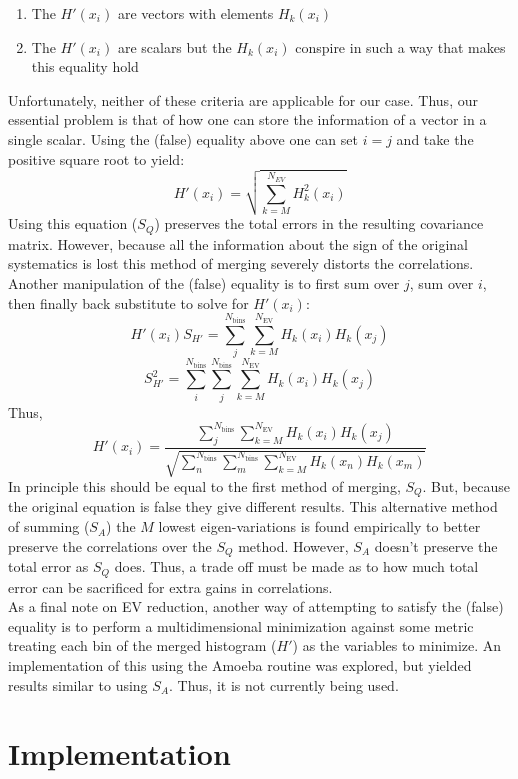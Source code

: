 \begin{enumerate}
\def\labelenumi{\arabic{enumi}.}
\itemsep1pt\parskip0pt
\item
  The $H'(x_i)$ are vectors with elements $H_k(x_i)$
\item
  The $H'(x_i)$ are scalars but the $H_k(x_i)$ conspire in such a way
  that makes this equality hold
\end{enumerate}

Unfortunately, neither of these criteria are applicable for our case.
Thus, our essential problem is that of how one can store the information
of a vector in a single scalar. Using the (false) equality above one can
set $i=j$ and take the positive square root to yield: \[
H'(x_i)=\sqrt{\sum_{k=M}^{N_{EV}}H_k^2(x_i)}
\] Using this equation ($S_Q$) preserves the total errors in the
resulting covariance matrix. However, because all the information about
the sign of the original systematics is lost this method of merging
severely distorts the correlations. Another manipulation of the (false)
equality is to first sum over $j$, sum over $i$, then finally back
substitute to solve for $H'(x_i)$: \[
H'(x_i)S_{H'}=\sum_j^{N_{\mathrm{bins}}}\sum_{k=M}^{N_{\mathrm{EV}}} H_k(x_i)H_k(x_j)
\] \[
S_{H'}^2=\sum_i^{N_{\mathrm{bins}}}\sum_j^{N_{\mathrm{bins}}}\sum_{k=M}^{N_{\mathrm{EV}}} H_k(x_i)H_k(x_j)
\] Thus, \[
\displaystyle H'(x_i)=\frac{\sum_j^{N_{\mathrm{bins}}}\sum_{k=M}^{N_{\mathrm{EV}}} H_k(x_i)H_k(x_j)}
{\sqrt{\sum_n^{N_{\mathrm{bins}}}\sum_m^{N_{\mathrm{bins}}}\sum_{k=M}^{N_{\mathrm{EV}}} H_k(x_n)H_k(x_m)}}
\] In principle this should be equal to the first method of merging,
$S_Q$. But, because the original equation is false they give different
results. This alternative method of summing ($S_A$) the $M$ lowest
eigen-variations is found empirically to better preserve the
correlations over the $S_Q$ method. However, $S_A$ doesn't preserve the
total error as $S_Q$ does. Thus, a trade off must be made as to how much
total error can be sacrificed for extra gains in correlations.\\As a
final note on EV reduction, another way of attempting to satisfy the
(false) equality is to perform a multidimensional minimization against
some metric treating each bin of the merged histogram ($H'$) as the
variables to minimize. An implementation of this using the Amoeba
routine was explored, but yielded results similar to using $S_A$. Thus,
it is not currently being used.

\section{Implementation}\label{implementation}

